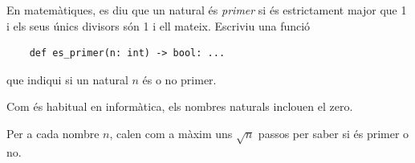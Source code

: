 

\Statement

En matemàtiques, es diu que un natural és \emph{primer} si és estrictament major que 1 i els seus únics divisors són 1 i ell mateix. Escriviu una funció

\lstset{language=Python}
\begin{lstlisting}
    def es_primer(n: int) -> bool: ...
\end{lstlisting}

que indiqui si un natural $n$ és o no primer. 

\Observation

Com és habitual en informàtica, els nombres naturals inclouen el zero.

\Hint

Per a cada nombre $n$, calen com a màxim uns $\sqrt{n}$  passos per saber si és primer o no.
